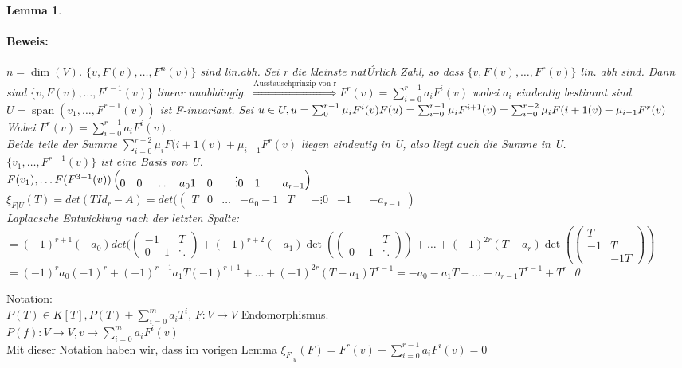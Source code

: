 \documentclass{report}
\newcommand{\ve}[1]{{\begin{pmatrix}#1 \end{pmatrix}}}
\DeclareMathOperator{\Span}{span}
\theoremstyle{customrem}
\theoremstyle{customdef}
\newtheorem{lemma}[definition]{Lemma}
\renewenvironment{proof}{\paragraph{Beweis: }}{\qed}
\theoremstyle{customenv}
\begin{document}
\begin{lemma}
  \begin{proof}
    \(n = \dim(V)\).
    \(\{v, F(v), \dots, F^n(v)\}\) sind lin.abh. Sei r die kleinste nat\'Urlich Zahl,
    so dass \(\{v, F(v), \dots, F^r(v)\}\) lin. abh sind. Dann sind
    \(\{v, F(v), \dots, F^{r-1}(v)\}\) linear unabh\"angig.
    \(\overset{\text{Ausstauschprinzip von r}}{\Rightarrow} F^r(v) = \sum_{i=0}^{r-1} a_i F^i(v)\)
    wobei \(a_i\) eindeutig bestimmt sind.\\
    \(U = \Span(v_1, \dots, F^{r-1}(v))\) ist F-invariant. Sei \(u \in U, u = \sum_{0}^{r-1} \mu_iF^i(v)\\
    F(u) = \sum_{i=0}^{r-1} \mu_i F^{i+1}(v)\\
    = \sum_{i=0}^{r-2} \mu_iF({i+1}(v) + \mu_{i-1}F^r(v)\)
    Wobei \(F^r(v) = \sum_{i=0}^{r-1} a_iF^i(v)\).\\
    Beide teile der Summe \(\sum_{i=0}^{r-2} \mu_iF({i+1}(v) + \mu_{i-1}F^r(v)\) liegen eindeutig in U, also liegt auch die Summe in U.\\
    \(\{v_1, \dots, F^{r-1}(v)\}\) ist eine Basis von U.\\
    \(F(v_1), \dots F(F^{3-1}(v))\\
    \begin{pmatrix}
      0 & 0 & \dots & a_0
      1 & 0 &       & \vdots
      0 & 1 &       & a_{r-1}
    \end{pmatrix}\)\\
    \(\xi_{F|U}(T) = det(T Id_r - A)
    = det(    \begin{pmatrix}
      T & 0 & \dots & -a_0
      -1 & T &       & -\vdots
      0 & -1 &       & -a_{r-1}
    \end{pmatrix}\)\\
    Laplacsche Entwicklung nach der letzten Spalte:
    \(= (-1)^{r+1}(-a_0) det(\ve{-1 & T\\0 -1 & \ddots} + (-1)^{r+2}(-a_1)\det(\ve{& T\\0 -1 & \ddots}) + \dots + (-1)^{2r} (T - a_r) \det(\ve{T\\-1 & T\\  & -1 T})\)
    \(= (-1)^r a_0 (-1)^r + (-1)^{r+1} a_1T (-1)^{r+1} + \dots + (-1)^{2r}(T - a_1)T^{r-1}
    = - a_0 - a_1 T - \dots - a_{r-1}T^{r-1} + T^r\)
  \end{proof}
\end{lemma}

Notation:\\
\(P(T) \in K[T], P(T) + \sum_{i=0}^m a_iT^i\), \(F : V \to V\) Endomorphismus.\\
\(P(f) : V \to V, v \mapsto \sum_{i=0}^m a_iF^i(v)\)\\
Mit dieser Notation haben wir, dass im vorigen Lemma
\(\xi_{F|_u}(F) = F^r(v) - \sum_{i=0}^{r-1} a_i F^i(v) = 0\)
\end{document}
